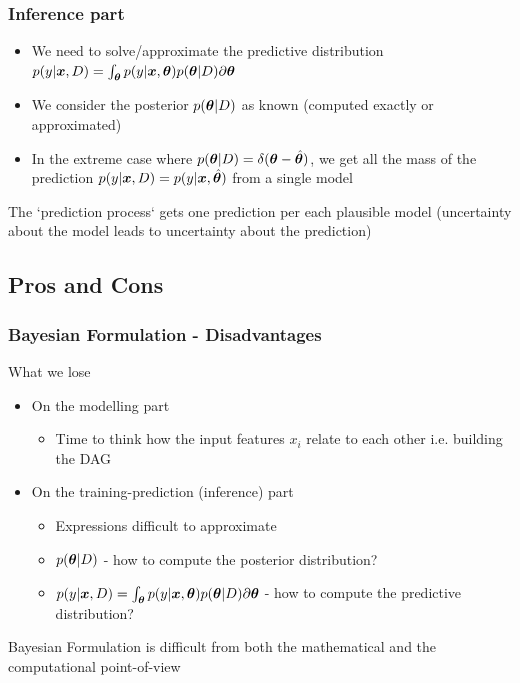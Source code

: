 \begin{frame}
  \frametitle{Inference part}
  \begin{itemize}
  \item We need to solve/approximate the predictive distribution $p(y|\boldsymbol{x}, D) = \int_{\boldsymbol{\theta}} p(y|\boldsymbol{x},\boldsymbol{\theta})p(\boldsymbol{\theta}|D) \partial \boldsymbol{\theta}$
  \item We consider the posterior $p(\boldsymbol{\theta}|D)$ as known (computed exactly or approximated)
  \item In the extreme case where
    $p(\boldsymbol{\theta}|D) = \delta(\boldsymbol{\theta} - \hat{\boldsymbol{\theta}})$, we get all the mass of the
    prediction $p(y|\boldsymbol{x}, D) = p(y|\boldsymbol{x},\hat{\boldsymbol{\theta}})$ from a single model
  \end{itemize}

    \noindent\makebox[\linewidth]{\rule{\paperwidth}{0.4pt}}
  The `prediction process` gets one prediction per each
    plausible model (\alert{uncertainty about the model leads to uncertainty about the
    prediction})


\end{frame}

\subsection{Pros and Cons}
\begin{frame}
  \frametitle{Bayesian Formulation - Disadvantages}
  What we lose
  \begin{itemize}
  \item On the modelling part
    \begin{itemize}
    \item Time to think how the input features $x_i$ relate to each
      other i.e. building the DAG
    \end{itemize}
    \item On the training-prediction (inference) part
      \begin{itemize}
        \item Expressions difficult to approximate
        \item $p(\boldsymbol{\theta}|D)$ - how to compute the posterior distribution?
        \item $p(y|\boldsymbol{x},D) = \int_{\boldsymbol{\theta}} p(y|\boldsymbol{x}, \boldsymbol{\theta}) p(\boldsymbol{\theta}|D)\partial \boldsymbol{\theta}$ - how to compute the predictive distribution?
      \end{itemize}
    \end{itemize}
\noindent\makebox[\linewidth]{\rule{\paperwidth}{0.4pt}}
Bayesian Formulation is \alert{difficult from both the mathematical and the computational point-of-view}
\end{frame}

